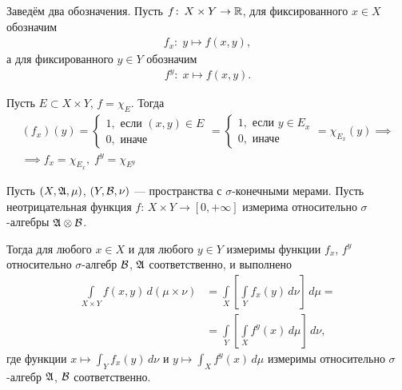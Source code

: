 
\begin{df}
 Заведём два обозначения. Пусть $f \colon\, X \times Y \to \mathbb{R} $, для фиксированного $x \in X$ обозначим \begin{align*}
  f_x \colon\; y \mapsto f(x, y)
 ,\end{align*} а для фиксированного $y \in Y$ обозначим \begin{align*}
  f^{y} \colon\; x \mapsto f(x, y)
 .\end{align*} 
\end{df}
\begin{remrk}
 \label{remark:cut_of_characteristic_function}
 Пусть $E \subset X \times Y$, $f = \chi_E$. Тогда \begin{align*}
  (f_x)(y) = \begin{cases}
   1, \text{ если } (x, y) \in E \\
   0, \text{ иначе }
  \end{cases} = \begin{cases}
   1, \text{ если } y \in E_x \\
   0, \text{ иначе }
  \end{cases} = \chi_{E_x}(y) \implies \\
  \implies f_x = \chi_{E_x}, \; f^{y} = \chi_{E^{y}}
 \end{align*} 
\end{remrk}
\begin{thm}[%
Тонелли]
\label{theorem:tonelli}

Пусть $(X, \mathfrak{A}, \mu)$, $(Y, \mathcal{B}, \nu)$  --- пространства с $\sigma$-конечными мерами. Пусть неотрицательная функция $f \colon\, X \times Y \to [0, +\infty] $  измерима относительно $\sigma$-алгебры $\mathfrak{A} \otimes \mathcal{B}$.

Тогда для любого $x \in X$ и для любого $y \in Y$ измеримы функции $f_x$, $f^{y}$ относительно $\sigma$-алгебр $\mathcal{B}$, $\mathfrak{A}$ соответственно, и выполнено \begin{align}
 \label{equation1:theorem:tonelli}
 \int\limits_{X \times Y} f(x,y) \, d(\mu \times \nu) &= \int\limits_{X}   \left[ \int\limits_{Y} f_x(y) \, d\nu   \right] \, d\mu = \\
 \label{equation2:theorem:tonelli}
 &= \int\limits_{Y} \left[ \int\limits_{X} f^{y}(x) \, d\mu   \right] \, d\nu  
,\end{align} где функции $x \mapsto \int_{Y} f_x(y) \, d\nu  $ и $y \mapsto \int_{X} f^{y}(x) \, d\mu  $ измеримы относительно $\sigma$-алгебр $\mathfrak{A}$, $\mathcal{B}$ соответственно.
\end{thm}
